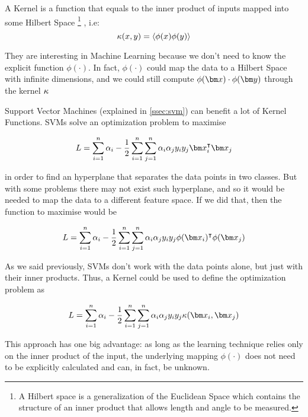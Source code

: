 \begin{pre-delivery}
  A Kernel\cite{bergman1970kernel} is a function that equals to the inner product of inputs mapped into
  some Hilbert Space
  \footnote{A Hilbert space is a generalization of the Euclidean Space which contains
  the structure of an inner product that allows length and angle to be
  measured.}
  , i.e:
  \begin{equation}
  \kappa(x,y) = \langle \phi(x)\phi(y) \rangle
\end{equation}

They are interesting in Machine Learning because we don't need to know the
explicit function $\phi(\cdot)$. In fact, $\phi(\cdot)$ could map the data to
a Hilbert Space with infinite dimensions, and we could still compute
$\phi(\vx)\cdot\phi(\vy)$ through the kernel $\kappa$

Support Vector Machines (explained in \ref{ssec:svm}) can benefit a lot of
Kernel Functions. SVMs solve an
optimization problem to maximise

\begin{equation}
  L = \sum_{i = 1}^n\alpha_i -\frac{1}{2}\sum_{i = 1}^n\sum_{j = 1}^n\alpha_i\alpha_jy_iy_j\vx_i^\transp\vx_j
\end{equation}

in order to find an hyperplane that separates the data points in two classes.
But with some problems there may not exist such hyperplane, and so it would
be needed to map the data to a different feature space. If we did that, then
the function to maximise would be

\begin{equation}
  L = \sum_{i = 1}^n\alpha_i -\frac{1}{2}\sum_{i = 1}^n\sum_{j = 1}^n\alpha_i\alpha_jy_iy_j\phi(\vx_i)^\transp\phi(\vx_j)
\end{equation}

As we said previously, SVMs don't work with the data points alone, but just with
their inner products. Thus, a Kernel could be used to define the optimization
problem as

\begin{equation}
  L = \sum_{i = 1}^n\alpha_i -\frac{1}{2}\sum_{i = 1}^n\sum_{j = 1}^n\alpha_i\alpha_jy_iy_j\kernel(\vx_i, \vx_j)
\end{equation}

This approach has one big advantage:
as long as the learning technique relies
only on the inner product of the input, the underlying mapping $\phi(\cdot)$
does not need to be explicitly calculated and can, in fact, be unknown\cite{burges1998tutorial}.


\end{pre-delivery}
